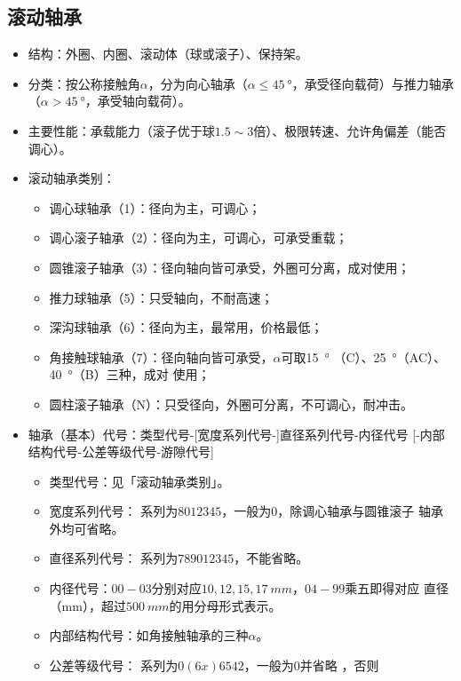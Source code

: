 \documentclass[12pt,a4paper]{article}
\newcommand{\tightlist}{\setlength{\parskip}{0pt}\setlength{\itemsep}{0pt}}
\newcommand{\hint}[1]{\textsf{（#1）}}
\newcommand{\minor}[1]{{\color{gray} #1}}
\begin{document}
\subsection{滚动轴承}
\begin{itemize}\tightlist
    \item 结构：外圈、内圈、滚动体\hint{球或滚子}、保持架。
    \item 分类：按公称接触角$\alpha$，分为向心轴承\hint{$\alpha\leq\SI{45}{\degree%
    }$，承受径向载荷}与推力轴承\hint{$\alpha>\SI{45}{\degree}$，承受轴向载荷}。
    \item 主要性能：承载能力\hint{滚子优于球$1.5\sim3$倍}、极限转速、允许角偏差\hint%
    {能否调心}。
    \item 滚动轴承类别：
    \begin{itemize}\tightlist
        \item 调心球轴承\hint{1}：径向为主，可调心；
        \item 调心滚子轴承\hint{2}：径向为主，可调心，可承受重载；
        \item 圆锥滚子轴承\hint{3}：径向轴向皆可承受，外圈可分离，成对使用；
        \item 推力球轴承\hint{5}：只受轴向，不耐高速；
        \item 深沟球轴承\hint{6}：径向为主，最常用，价格最低；
        \item 角接触球轴承\hint{7}：径向轴向皆可承受，$\alpha$可取\SI{15}{\degree}
        \hint{C}、\SI{25}{\degree}\hint{AC}、\SI{40}{\degree}\hint{B}三种，成对
        使用；
        \item 圆柱滚子轴承\hint{N}：只受径向，外圈可分离，不可调心，耐冲击。
    \end{itemize}
    \item 轴承（基本）代号：类型代号-[宽度系列代号-]直径系列代号-内径代号\minor{%
    [-内部结构代号-公差等级代号-游隙代号]}
    \begin{itemize}\tightlist
        \item 类型代号：见「滚动轴承类别」。
        \item 宽度系列代号：\minor{系列为$8012345$，}一般为$0$，除调心轴承与圆锥滚子
        轴承外均可省略。
        \item 直径系列代号：\minor{系列为$789012345$，}不能省略。
        \item 内径代号：$00-03$分别对应$10,12,15,\SI{17}{mm}$，$04-99$乘五即得对应
        直径\hint{mm}，超过$\SI{500}{mm}$的用分母形式表示。
        \item 内部结构代号：如角接触轴承的三种$\alpha$。
        \item 公差等级代号：\minor{系列为$0(6x)6542$，}一般为$0$并省略\minor{，否则
}
\end{itemize}
\end{itemize}
\end{document}
